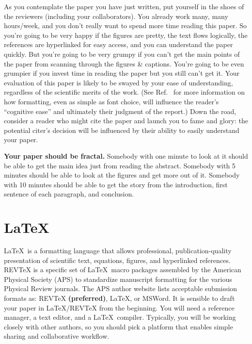 \documentclass[aps,prb,twocolumn,superscriptaddress,floatfix,longbibliography]{revtex4-2}
\newif\ifptitle
\newif\ifpnumber
\newcounter{para}
\newcommand\ptitle[1]{\par\refstepcounter{para}
{\ifpnumber{\noindent\textcolor{lightgray}{\textbf{\thepara}}\indent}\fi}
{\ifptitle{\textbf{[{#1}]}}\fi}}
\begin{document}
\ptitle{Formatting matters} As you contemplate the paper you have just written, put yourself in the shoes of the reviewers (including your collaborators). You already work many, many hours/week, and you don't really want to spend more time reading this paper. So you're going to be very happy if the figures are pretty, the text flows logically, the references are hyperlinked for easy access, and you can understand the paper quickly. But you're going to be very grumpy if you can't get the main points of the paper from scanning through the figures \& captions. You're going to be even grumpier if you invest time in reading the paper but you still can't get it. Your evaluation of this paper is likely to be swayed by your ease of understanding, regardless of the scientific merits of the work. (See Ref.\  for more information on how formatting, even as simple as font choice, will influence the reader's ``cognitive ease'' and ultimately their judgment of the report.) Down the road, consider a reader who might cite the paper and launch you to fame and glory: the potential citer's decision will be influenced by their ability to easily understand your paper.

\ptitle{Fractal} \textbf{Your paper should be fractal.} Somebody with one minute to look at it should be able to get the main idea just from reading the abstract. Somebody with 5 minutes should be able to look at the figures and get more out of it. Somebody with 10 minutes should be able to get the story from the introduction, first sentence of each paragraph, and conclusion.

\section{\label{sec:LaTeX}\LaTeX}

\ptitle{Intro to \LaTeX} \LaTeX\ is a formatting language that allows professional, publication-quality presentation of scientific text, equations, figures, and hyperlinked references. REVTeX is a specific set of \LaTeX\ macro packages assembled by the American Physical Society (APS) to standardize manuscript formatting for the various Physical Review journals. The APS author website \cite{PhysicalReview} lists acceptable submission formats as: REVTeX \textbf{(preferred)}, \LaTeX, or MSWord. It is sensible to draft your paper in \LaTeX/REVTeX from the beginning. You will need a reference manager, a text editor, and a \LaTeX\ compiler. Typically, you will be working closely with other authors, so you should pick a platform that enables simple sharing and collaborative workflow.
\end{document}
